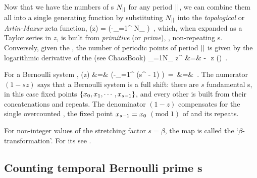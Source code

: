 \subsection{\Tzeta}
\label{s:bernZeta}

Now that we have the numbers of {\lattstate}s $N_{{||}}$ for any
period ${||}$, we can combine them all into a single generating function by
substituting $N_{{||}}$ into the {\em topological} or {\em Artin-Mazur}
zeta func\-tion,
\beq
\zetatop(z) =
     \exp\left(-\sum_{\cl{}=1}^\infty
{} N_\cl{}
         \right)
\,,
which, when expanded as a Taylor series in $z$, is built from
\emph{primitive} (or \emph{prime}), \ie, non-repeating {\lattstate}s. Conversely, given the \tzeta, the number of periodic
points of period ${||}$ is given by the logarithmic derivative of the
{\tzeta} (see
{ChaosBook})
\bea
\sum_{\cl{}=1}N_\cl{} z^\cl{}
    &=& - \,\,z (\zetatop)
\,.
\label{zetatop-N}
\eea

For a Bernoulli system ,
\bea
\zetatop(z)
 &=&  \exp \left(-\sum_{\cl{}=1}^\infty
{} ({s}^\cl{} - 1)
         \right)
\,=\,
\exp \left[\ln(1 -  {s}z) - \ln(1 - z) \right]
\continue
 &=&
\,.
\label{BernZeta}
\eea
The numerator $(1 - {s}z)$ says that a Bernoulli system is a full
shift: there are $s$ fundamental {\lattstate}s, in this case
fixed points $\{x_0,x_1,\cdots,x_{s-1}\}$, and every other
{\lattstate} is built from their concatenations and repeats. The
denominator $(1 - z)$ compensates for the single overcounted {\lattstate}, the fixed point $x_{{s}-1}=x_{0}$ $(\mbox{mod}\;1)$ of
 and its repeats.

For non-integer values of the stretching factor ${s}=\beta$, the map
 is called the `$\beta$-transformation'. For its
{\tzeta} see .

\subsection{Counting {temporal Bernoulli} prime \po s}
\label{s:bernPrime}

